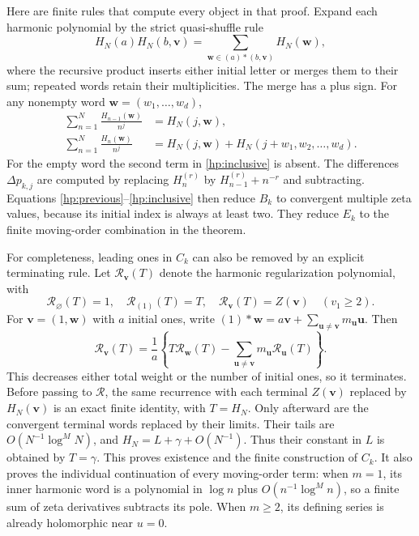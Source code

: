 \documentclass[11pt]{article}
\numberwithin{equation}{section}
\theoremstyle{plain}
\theoremstyle{definition}
\theoremstyle{remark}
\begin{document}
Here are finite rules that compute every object in that proof. Expand
each harmonic polynomial by the strict quasi-shuffle rule
\begin{equation}\label{hp:stuffle}
 H_N(a)H_N(b,\mathbf v)
   =\sum_{\mathbf w\in(a)*(b,\mathbf v)}H_N(\mathbf w),
\end{equation}
where the recursive product inserts either initial letter or merges
them to their sum; repeated words retain their multiplicities. The
merge has a plus sign. For any nonempty word $\mathbf w=(w_1,\ldots,w_d)$,
\begin{align}
 \sum_{n=1}^N\frac{H_{n-1}(\mathbf w)}{n^j}
     &=H_N(j,\mathbf w),\label{hp:previous}\\
 \sum_{n=1}^N\frac{H_n(\mathbf w)}{n^j}
     &=H_N(j,\mathbf w)+H_N(j+w_1,w_2,\ldots,w_d).
       \label{hp:inclusive}
\end{align}
For the empty word the second term in \eqref{hp:inclusive} is absent.
The differences $\Delta p_{k,j}$ are computed by replacing
$H_n^{(r)}$ by $H_{n-1}^{(r)}+n^{-r}$ and subtracting.
Equations \eqref{hp:previous}--\eqref{hp:inclusive} then reduce $B_k$
to convergent multiple zeta values, because its initial index is
always at least two. They reduce $E_k$ to the finite moving-order
combination in the theorem.

For completeness, leading ones in $C_k$ can also be removed by an
explicit terminating rule. Let $\mathcal R_{\mathbf v}(T)$ denote
the harmonic regularization polynomial, with
\[
 \mathcal R_\varnothing(T)=1,\quad \mathcal R_{(1)}(T)=T,
 \quad\mathcal R_{\mathbf v}(T)=Z(\mathbf v)\quad(v_1\ge2).
\]
For $\mathbf v=(1,\mathbf w)$ with $a$ initial ones, write
$(1)*\mathbf w=a\mathbf v+\sum_{\mathbf u\ne\mathbf v}
m_{\mathbf u}\mathbf u$. Then
\begin{equation}\label{hp:regularization}
 \mathcal R_{\mathbf v}(T)=\frac1a
  \left\{T\mathcal R_{\mathbf w}(T)
       -\sum_{\mathbf u\ne\mathbf v}m_{\mathbf u}
                         \mathcal R_{\mathbf u}(T)\right\}.
\end{equation}
This decreases either total weight or the number of initial ones,
so it terminates. Before passing to $\mathcal R$, the same recurrence
with each terminal $Z(\mathbf v)$ replaced by $H_N(\mathbf v)$
is an exact finite identity, with $T=H_N$. Only afterward are the
convergent terminal words replaced by their limits. Their tails are
$O(N^{-1}\log^M N)$, and $H_N=L+\gamma+O(N^{-1})$.
Thus their constant in $L$ is obtained by $T=\gamma$.
This proves existence and the finite construction of $C_k$.
It also proves the individual continuation of every moving-order term:
when $m=1$, its inner harmonic word is a polynomial in $\log n$
plus $O(n^{-1}\log^M n)$, so a finite sum of zeta derivatives
subtracts its pole. When $m\ge2$, its defining series is already
holomorphic near $u=0$.
\end{document}
